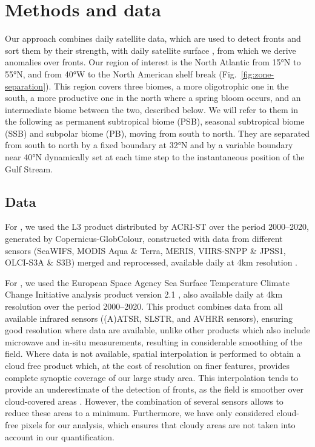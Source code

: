 \section{Methods and data}

Our approach combines daily satellite  data, which are used to detect fronts and sort them by their strength, with daily satellite surface , from which we derive anomalies over fronts.
Our region of interest is the North Atlantic from 15°N to 55°N, and from 40°W to the North American shelf break (Fig.~\ref{fig:zone-separation}).
This region covers three biomes, a more oligotrophic one in the south, a more productive one in the north where a spring bloom occurs, and an intermediate biome between the two, described below.
We will refer to them in the following as permanent subtropical biome (PSB), seasonal subtropical biome (SSB) and subpolar biome (PB), moving from south to north.
They are separated from south to north by a fixed boundary at 32°N and by a variable boundary near 40°N dynamically set at each time step to the instantaneous position of the Gulf Stream.

\subsection{Data}

For , we used the L3 product distributed by ACRI-ST over the period 2000--2020, generated by Copernicus-GlobColour, constructed with data from different sensors (SeaWIFS, MODIS Aqua \& Terra, MERIS, VIIRS-SNPP \& JPSS1, OLCI-S3A \& S3B) merged and reprocessed, available daily at 4km resolution \parencite{chl}.

For , we used the European Space Agency Sea Surface Temperature Climate Change Initiative analysis product version 2.1 \parencite{merchant_2019, good_2020, sst}, also available daily at 4km resolution over the period 2000--2020.
This product combines data from all available infrared sensors ((A)ATSR, SLSTR, and AVHRR sensors), ensuring good resolution where data are available, unlike other  products which also include microwave and in-situ measurements, resulting in considerable smoothing of the  field. %
Where  data is not available, spatial interpolation is performed to obtain a cloud free product which, at the cost of resolution on finer features, provides complete synoptic coverage of our large study area.
This interpolation tends to provide an underestimate of the detection of fronts, as the  field is smoother over cloud-covered areas \parencite{merchant_2019}.
However, the combination of several sensors allows to reduce these areas to a minimum.
Furthermore, we have only considered cloud-free pixels for our analysis, which ensures that cloudy areas are not taken into account in our quantification.


